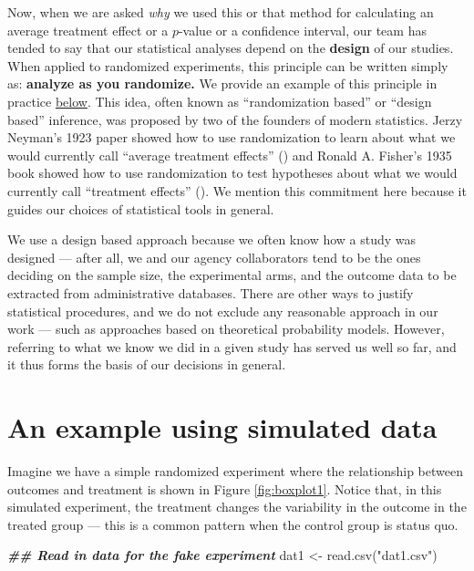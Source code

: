 \documentclass[
  12pt,
]{book}
\newenvironment{Shaded}{\begin{snugshade}}{\end{snugshade}}
\newcommand{\DocumentationTok}[1]{\textcolor[rgb]{0.56,0.35,0.01}{\textbf{\textit{#1}}}}
\newcommand{\FunctionTok}[1]{\textcolor[rgb]{0.00,0.00,0.00}{#1}}
\newcommand{\NormalTok}[1]{#1}
\newcommand{\OtherTok}[1]{\textcolor[rgb]{0.56,0.35,0.01}{#1}}
\newcommand{\StringTok}[1]{\textcolor[rgb]{0.31,0.60,0.02}{#1}}
\theoremstyle{definition}
\theoremstyle{definition}
\theoremstyle{definition}
\theoremstyle{remark}
\begin{document}
Now, when we are asked \emph{why} we used this or that method for
calculating an average treatment effect or a \(p\)-value or a confidence
interval, our team has tended to say that our statistical analyses
depend on the \textbf{design} of our studies. When applied to randomized
experiments, this principle can be written simply as: \textbf{analyze as
you randomize.} We provide an example of this principle in practice
\protect\hyperlink{randinfex}{below}. This idea, often known as
``randomization based'' or ``design based'' inference, was proposed by
two of the founders of modern statistics. Jerzy Neyman's 1923 paper
showed how to use randomization to learn about what we would currently
call ``average treatment effects'' (\citet{neyman_application_1923}) and
Ronald A. Fisher's 1935 book showed how to use randomization to test
hypotheses about what we would currently call ``treatment effects''
(\citet{fisher_design_1935}). We mention this commitment here because it
guides our choices of statistical tools in general.

We use a design based approach because we often know how a study was
designed --- after all, we and our agency collaborators tend to be the
ones deciding on the sample size, the experimental arms, and the outcome
data to be extracted from administrative databases. There are other ways
to justify statistical procedures, and we do not exclude any reasonable
approach in our work --- such as approaches based on theoretical
probability models. However, referring to what we know we did in a given
study has served us well so far, and it thus forms the basis of our
decisions in general.

\hypertarget{randinfex}{%
\section{An example using simulated data}\label{randinfex}}

Imagine we have a simple randomized experiment where the relationship
between outcomes and treatment is shown in Figure \ref{fig:boxplot1}.
Notice that, in this simulated experiment, the treatment changes the
variability in the outcome in the treated group --- this is a common
pattern when the control group is status quo.

\begin{Shaded}
\begin{Highlighting}[]
\DocumentationTok{\#\# Read in data for the fake experiment}
\NormalTok{dat1 }\OtherTok{\textless{}{-}} \FunctionTok{read.csv}\NormalTok{(}\StringTok{"dat1.csv"}\NormalTok{)}
\end{Highlighting}
\end{Shaded}
\end{document}
